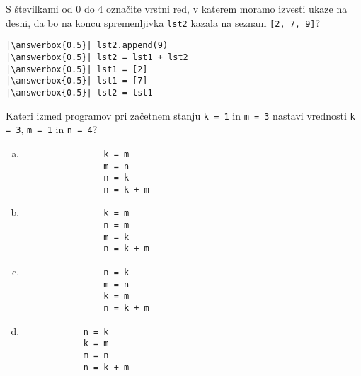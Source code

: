 \documentclass[arhiv, 10pt]{../izpit}
\newcommand{\inlinepy}[1]{\texttt{#1}}
\newcommand{\answerbox}[1]{\framebox{\vphantom{\large M}\hspace{#1cm}}}
\begin{document}
        \naloga*
        \begin{multicols}{2}
        \noindent 
        S številkami od $0$ do $4$ označite vrstni red, v katerem moramo izvesti ukaze na desni, da bo na koncu spremenljivka \inlinepy{lst2} kazala na seznam \inlinepy{[2, 7, 9]}?
    
        \columnbreak
        \noindent
        \begin{verbatim}
|\answerbox{0.5}| lst2.append(9)
|\answerbox{0.5}| lst2 = lst1 + lst2
|\answerbox{0.5}| lst1 = [2]
|\answerbox{0.5}| lst1 = [7]
|\answerbox{0.5}| lst2 = lst1

        \end{verbatim}
        \end{multicols}
    
            
        \naloga*
        
        Kateri izmed programov pri začetnem stanju
            \inlinepy{k = 1} in
            \inlinepy{m = 3}
        nastavi vrednosti
            \inlinepy{k = 3},
            \inlinepy{m = 1} in
            \inlinepy{n = 4}?
    
        \begin{multicols}{4}
        \begin{enumerate}[(a)]
\item 
                \begin{verbatim}
                k = m
                m = n
                n = k
                n = k + m
                \end{verbatim}
            
\item 
                \begin{verbatim}
                k = m
                n = m
                m = k
                n = k + m
                \end{verbatim}
            
\item 
                \begin{verbatim}
                n = k
                m = n
                k = m
                n = k + m
                \end{verbatim}
            
\item 
            \begin{verbatim}
            n = k
            k = m
            m = n
            n = k + m
            \end{verbatim}
        
\end{enumerate}

        \end{multicols}
    
\end{document}
